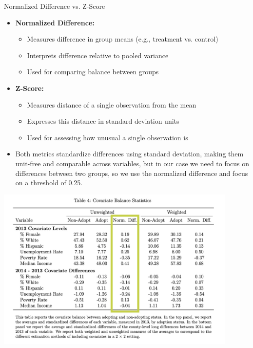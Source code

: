 \documentclass{beamer}
\begin{document}
\begin{frame}{Normalized Difference vs. Z-Score}
    \begin{itemize}
        \item \textbf{Normalized Difference:}
        \begin{itemize}
            \item Measures difference in group means (e.g., treatment vs. control)
            \item Interprets difference relative to pooled variance
            \item Used for comparing balance between groups
        \end{itemize}
        \vspace{0.5em}
        \item \textbf{Z-Score:}
        \begin{itemize}
            \item Measures distance of a single observation from the mean
            \item Expresses this distance in standard deviation units
            \item Used for assessing how unusual a single observation is
        \end{itemize}
        \vspace{0.5em}
        \item Both metrics standardize differences using standard deviation, making them unit-free and comparable across variables, but in our case we need to focus on differences between two groups, so we use the normalized difference and focus on a threshold of 0.25.
    \end{itemize}
\end{frame}


\begin{frame}
    \centering
    \includegraphics[width=0.9\textwidth]{./lecture_includes/table_jel_covariates.jpg}
\end{frame}
\end{document}
